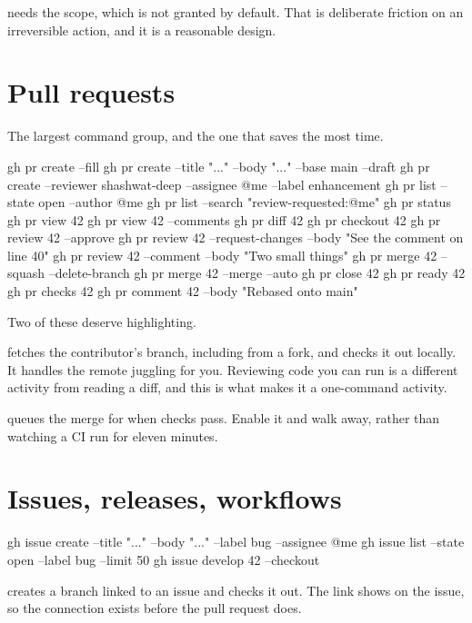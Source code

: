 \documentclass[11pt]{article}
\begin{document}
\begin{note}
 needs the  scope, which is not granted by
default. That is deliberate friction on an irreversible action, and it is a
reasonable design.
\end{note}

\section{Pull requests}

The largest command group, and the one that saves the most time.

\begin{shell}
gh pr create --fill
gh pr create --title "..." --body "..." --base main --draft
gh pr create --reviewer shashwat-deep --assignee @me --label enhancement
gh pr list --state open --author @me
gh pr list --search "review-requested:@me"
gh pr status
gh pr view 42
gh pr view 42 --comments
gh pr diff 42
gh pr checkout 42
gh pr review 42 --approve
gh pr review 42 --request-changes --body "See the comment on line 40"
gh pr review 42 --comment --body "Two small things"
gh pr merge 42 --squash --delete-branch
gh pr merge 42 --merge --auto
gh pr close 42
gh pr ready 42
gh pr checks 42
gh pr comment 42 --body "Rebased onto main"
\end{shell}

Two of these deserve highlighting.

 fetches the contributor's branch, including from a fork, and
checks it out locally. It handles the remote juggling for you. Reviewing code you can
run is a different activity from reading a diff, and this is what makes it a
one-command activity.

 queues the merge for when checks pass. Enable it and walk
away, rather than watching a CI run for eleven minutes.

\section{Issues, releases, workflows}

\begin{shell}
gh issue create --title "..." --body "..." --label bug --assignee @me
gh issue list --state open --label bug --limit 50
gh issue develop 42 --checkout
\end{shell}

 creates a branch linked to an issue and checks it out. The link
shows on the issue, so the connection exists before the pull request does.
\end{document}
